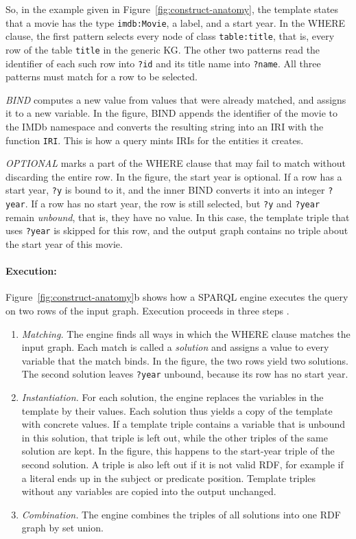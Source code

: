 So, in the example given in Figure~\ref{fig:construct-anatomy}, the template states that a movie has the type \texttt{imdb:Movie}, a label, and a start year. In the WHERE clause, the first pattern selects every node of class \texttt{table:title}, that is, every row of the table \texttt{title} in the generic KG\@. The other two patterns read the identifier of each such row into \texttt{?id} and its title name into \texttt{?name}. All three patterns must match for a row to be selected.

\emph{BIND} computes a new value from values that were already matched, and assigns it to a new variable. In the figure, BIND appends the identifier of the movie to the IMDb namespace and converts the resulting string into an IRI with the function \texttt{IRI}. This is how a query mints IRIs for the entities it creates.

\emph{OPTIONAL} marks a part of the WHERE clause that may fail to match without discarding the entire row. In the figure, the start year is optional. If a row has a start year, \texttt{?y} is bound to it, and the inner BIND converts it into an integer \texttt{?year}. If a row has no start year, the row is still selected, but \texttt{?y} and \texttt{?year} remain \emph{unbound}, that is, they have no value. In this case, the template triple that uses \texttt{?year} is skipped for this row, and the output graph contains no triple about the start year of this movie.

\paragraph{Execution:}
Figure~\ref{fig:construct-anatomy}b shows how a SPARQL engine executes the query on two rows of the input graph. Execution proceeds in three steps \citep{world2013sparql}.

\begin{enumerate}
  \item \emph{Matching.} The engine finds all ways in which the WHERE clause matches the input graph. Each match is called a \emph{solution} and assigns a value to every variable that the match binds. In the figure, the two rows yield two solutions. The second solution leaves \texttt{?year} unbound, because its row has no start year.
  \item \emph{Instantiation.} For each solution, the engine replaces the variables in the template by their values. Each solution thus yields a copy of the template with concrete values. If a template triple contains a variable that is unbound in this solution, that triple is left out, while the other triples of the same solution are kept. In the figure, this happens to the start-year triple of the second solution. A triple is also left out if it is not valid RDF, for example if a literal ends up in the subject or predicate position. Template triples without any variables are copied into the output unchanged.
  \item \emph{Combination.} The engine combines the triples of all solutions into one RDF graph by set union.
\end{enumerate}

